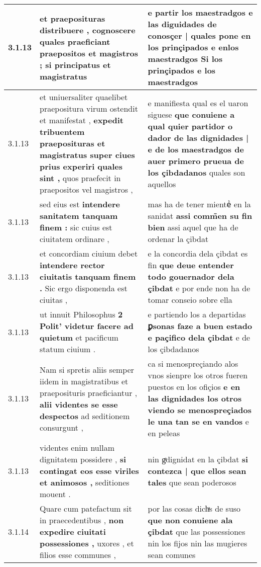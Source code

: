 \begin{tabular}{|p{1cm}|p{6.5cm}|p{6.5cm}|}
3.1.13 & et praeposituras distribuere , \textbf{ cognoscere quales praeficiant praepositos et magistros ; } si principatus et magistratus & e partir los maestradgos e las diguidades \textbf{ de conosçer | quales pone en los prinçipados e enlos maestradgos } Si los prinçipados e los maestradgos \\\hline
3.1.13 & et uniuersaliter quaelibet praepositura virum ostendit et manifestat , \textbf{ expedit tribuentem praeposituras et magistratus super ciues prius experiri quales sint , } quos praefecit in praepositos vel magistros , & e manifiesta qual es el uaron siguese \textbf{ que conuiene a qual quier partidor o dador de las dignidades | e de los maestradgos de auer primero prueua de los çibdadanos } quales son aquellos \\\hline
3.1.13 & sed eius est \textbf{ intendere sanitatem tanquam finem : } sic cuius est ciuitatem ordinare , & mas ha de tener mienteᷤ en la sanidat \textbf{ assi comm̃en su fin bien } assi aquel que ha de ordenar la çibdat \\\hline
3.1.13 & et concordiam ciuium debet \textbf{ intendere rector ciuitatis tanquam finem . } Sic ergo disponenda est ciuitas , & e la concordia dela çibdat es fin \textbf{ que deue entender todo gouernador dela çibdat } e por ende non ha de tomar conseio sobre ella \\\hline
3.1.13 & ut innuit Philosophus \textbf{ 2 Polit’ videtur facere ad quietum } et pacificum statum ciuium . & e partiendo los a departidas \textbf{ ꝑsonas faze a buen estado e paçifico dela çibdat } e de los çibdadanos \\\hline
3.1.13 & Nam si spretis aliis semper iidem in magistratibus et praeposituris praeficiantur , \textbf{ alii videntes se esse despectos } ad seditionem consurgunt , & ca si menospreçiando alos vnos sienpre los otros fueren puestos en los ofiçios \textbf{ e en las dignidades los otros viendo se menospreçiados le una tan se en vandos } e en peleas \\\hline
3.1.13 & videntes enim nullam dignitatem possidere , \textbf{ si contingat eos esse viriles et animosos , } seditiones mouent . & nin gͤdignidat en la çibdat \textbf{ si contezca | que ellos sean tales } que sean poderosos \\\hline
3.1.14 & Quare cum patefactum sit in praecedentibus , \textbf{ non expedire ciuitati possessiones , } uxores , et filios esse communes , & por las cosas dichͣs de suso \textbf{ que non conuiene ala çibdat } que las possessiones nin los fijos nin las mugieres sean comunes \\\hline

\end{tabular}
